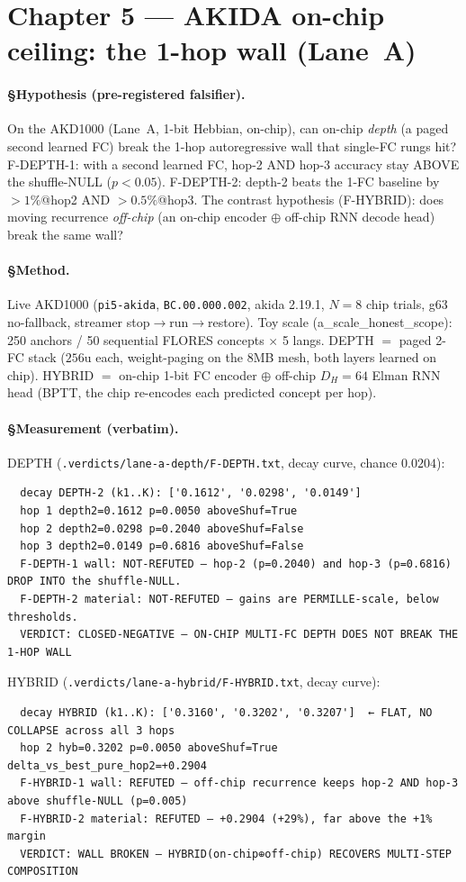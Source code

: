 \documentclass[11pt,a4paper]{article}
\begin{document}
\section{Chapter 5 --- AKIDA on-chip ceiling: the 1-hop wall (Lane~A)}
\label{sec:akida}

\paragraph{§Hypothesis (pre-registered falsifier).} On the AKD1000 (Lane~A, 1-bit
Hebbian, on-chip), can on-chip \emph{depth} (a paged second learned FC) break the
1-hop autoregressive wall that single-FC rungs hit? F-DEPTH-1: with a second learned
FC, hop-2 AND hop-3 accuracy stay ABOVE the shuffle-NULL ($p<0.05$). F-DEPTH-2:
depth-2 beats the 1-FC baseline by $>1\%$@hop2 AND $>0.5\%$@hop3. The contrast
hypothesis (F-HYBRID): does moving recurrence \emph{off-chip} (an on-chip encoder
$\oplus$ off-chip RNN decode head) break the same wall?

\paragraph{§Method.} Live AKD1000 (\texttt{pi5-akida}, \texttt{BC.00.000.002},
akida 2.19.1, $N{=}8$ chip trials, g63 no-fallback, streamer stop$\to$run$\to$restore).
Toy scale (a\_scale\_honest\_scope): 250 anchors / 50 sequential FLORES concepts
$\times$ 5 langs. DEPTH $=$ paged 2-FC stack ($256$u each, weight-paging on the 8MB
mesh, both layers learned on chip). HYBRID $=$ on-chip 1-bit FC encoder $\oplus$
off-chip $D_H{=}64$ Elman RNN head (BPTT, the chip re-encodes each predicted concept
per hop).

\paragraph{§Measurement (verbatim).}
DEPTH (\texttt{.verdicts/lane-a-depth/F-DEPTH.txt}, decay curve, chance $0.0204$):
\begin{verbatim}
  decay DEPTH-2 (k1..K): ['0.1612', '0.0298', '0.0149']
  hop 1 depth2=0.1612 p=0.0050 aboveShuf=True
  hop 2 depth2=0.0298 p=0.2040 aboveShuf=False
  hop 3 depth2=0.0149 p=0.6816 aboveShuf=False
  F-DEPTH-1 wall: NOT-REFUTED — hop-2 (p=0.2040) and hop-3 (p=0.6816) DROP INTO the shuffle-NULL.
  F-DEPTH-2 material: NOT-REFUTED — gains are PERMILLE-scale, below thresholds.
  VERDICT: CLOSED-NEGATIVE — ON-CHIP MULTI-FC DEPTH DOES NOT BREAK THE 1-HOP WALL
\end{verbatim}
HYBRID (\texttt{.verdicts/lane-a-hybrid/F-HYBRID.txt}, decay curve):
\begin{verbatim}
  decay HYBRID (k1..K): ['0.3160', '0.3202', '0.3207']  ← FLAT, NO COLLAPSE across all 3 hops
  hop 2 hyb=0.3202 p=0.0050 aboveShuf=True delta_vs_best_pure_hop2=+0.2904
  F-HYBRID-1 wall: REFUTED — off-chip recurrence keeps hop-2 AND hop-3 above shuffle-NULL (p=0.005)
  F-HYBRID-2 material: REFUTED — +0.2904 (+29%), far above the +1% margin
  VERDICT: WALL BROKEN — HYBRID(on-chip⊕off-chip) RECOVERS MULTI-STEP COMPOSITION
\end{verbatim}
\end{document}
